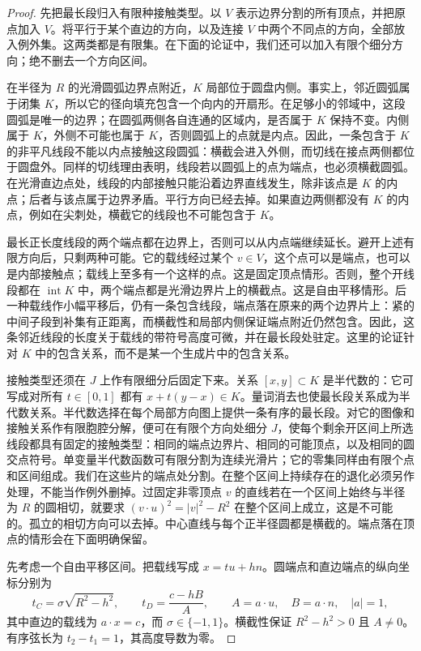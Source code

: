 \begin{proof}
先把最长段归入有限种接触类型。以 $V$ 表示边界分割的所有顶点，并把原点加入 $V$。将平行于某个直边的方向，以及连接 $V$ 中两个不同点的方向，全部放入例外集。这两类都是有限集。在下面的论证中，我们还可以加入有限个细分方向；绝不删去一个方向区间。

在半径为 $R$ 的光滑圆弧边界点附近，$K$ 局部位于圆盘内侧。事实上，邻近圆弧属于闭集 $K$，所以它的径向填充包含一个向内的开扇形。在足够小的邻域中，这段圆弧是唯一的边界；在圆弧两侧各自连通的区域内，是否属于 $K$ 保持不变。内侧属于 $K$，外侧不可能也属于 $K$，否则圆弧上的点就是内点。因此，一条包含于 $K$ 的非平凡线段不能以内点接触这段圆弧：横截会进入外侧，而切线在接点两侧都位于圆盘外。同样的切线理由表明，线段若以圆弧上的点为端点，也必须横截圆弧。在光滑直边点处，线段的内部接触只能沿着边界直线发生，除非该点是 $K$ 的内点；后者与该点属于边界矛盾。平行方向已经去掉。如果直边两侧都没有 $K$ 的内点，例如在尖刺处，横截它的线段也不可能包含于 $K$。

最长正长度线段的两个端点都在边界上，否则可以从内点端继续延长。避开上述有限方向后，只剩两种可能。它的载线经过某个 $v\in V$，这个点可以是端点，也可以是内部接触点；载线上至多有一个这样的点。这是固定顶点情形。否则，整个开线段都在 $\operatorname{int}K$ 中，两个端点都是光滑边界片上的横截点。这是自由平移情形。后一种载线作小幅平移后，仍有一条包含线段，端点落在原来的两个边界片上：紧的中间子段到补集有正距离，而横截性和局部内侧保证端点附近仍然包含。因此，这条邻近线段的长度关于载线的带符号高度可微，并在最长段处驻定。这里的论证针对 $K$ 中的包含关系，而不是某一个生成片中的包含关系。

接触类型还须在 $J$ 上作有限细分后固定下来。关系 $[x,y]\subset K$ 是半代数的：它可写成对所有 $t\in[0,1]$ 都有 $x+t(y-x)\in K$。量词消去也使最长段关系成为半代数关系。半代数选择在每个局部方向图上提供一条有序的最长段。对它的图像和接触关系作有限胞腔分解，便可在有限个方向处细分 $J$，使每个剩余开区间上所选线段都具有固定的接触类型：相同的端点边界片、相同的可能顶点，以及相同的圆交点符号。单变量半代数函数可有限分割为连续光滑片；它的零集同样由有限个点和区间组成。我们在这些片的端点处分割。在整个区间上持续存在的退化必须另作处理，不能当作例外删掉。过固定非零顶点 $v$ 的直线若在一个区间上始终与半径为 $R$ 的圆相切，就要求 $(v\cdot u)^2=|v|^2-R^2$ 在整个区间上成立，这是不可能的。孤立的相切方向可以去掉。中心直线与每个正半径圆都是横截的。端点落在顶点的情形会在下面明确保留。

先考虑一个自由平移区间。把载线写成 $x=tu+hn$。圆端点和直边端点的纵向坐标分别为
\[
 t_C=\sigma\sqrt{R^2-h^2},\qquad
 t_D=\frac{c-hB}{A},\qquad
 A=a\cdot u,\quad B=a\cdot n,\quad |a|=1,
\]
其中直边的载线为 $a\cdot x=c$，而 $\sigma\in\{-1,1\}$。横截性保证 $R^2-h^2>0$ 且 $A\ne0$。有序弦长为 $t_2-t_1=1$，其高度导数为零。


\end{proof}

